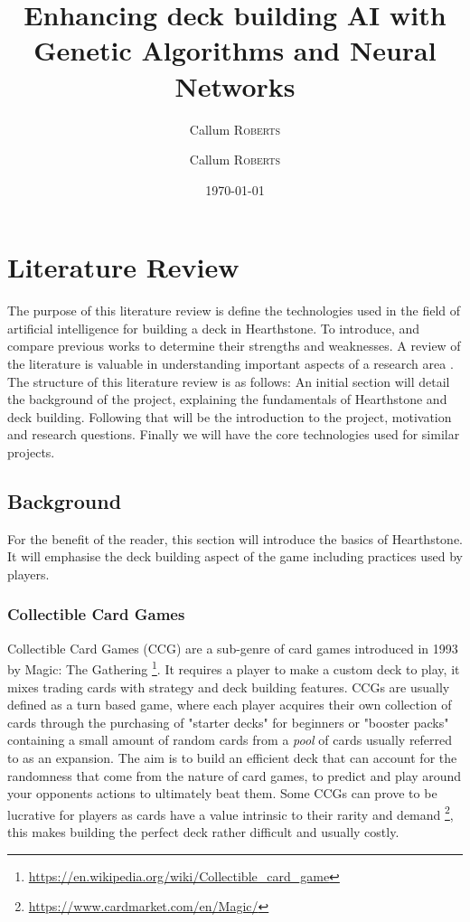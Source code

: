 \documentclass{report}
\title{Enhancing deck building AI with Genetic Algorithms and Neural Networks} %
\author{Callum \textsc{Roberts}} %
\author{Callum \textsc{Roberts}} %
\date{\today} %
\begin{document}
\maketitle %



\chapter{Literature Review}
The purpose of this literature review is define the technologies used in the field of artificial intelligence for building a deck in Hearthstone. To introduce, and compare previous works to determine their strengths and weaknesses. A review of the literature is valuable in understanding important aspects of a research area \cite{}. The structure of this literature review is as follows: An initial section will detail the background of the project, explaining the fundamentals of Hearthstone and deck building. Following that will be the introduction to the project,  motivation and research questions. Finally we will have the core technologies used for similar projects.
\section{Background}
	For the benefit of the reader, this section will introduce the basics of Hearthstone. It will emphasise the deck building aspect of the game including practices used by players.  
\subsection{Collectible Card Games}
	Collectible Card Games (CCG) are a sub-genre of card games introduced in 1993 by Magic: The Gathering \footnote{\url{https://en.wikipedia.org/wiki/Collectible_card_game}}. It requires a player to make a custom deck to play, it mixes trading cards with strategy and deck building features. CCGs are usually defined as a turn based game, where each player acquires their own collection of cards through the purchasing of "starter decks" for beginners or "booster packs" containing a small amount of random cards from a {\it{pool}} of cards usually referred to as an expansion. The aim is to build an efficient deck that can account for the randomness that come from the nature of card games, to predict and play around your opponents actions to ultimately beat them. Some CCGs can prove to be lucrative for players as cards have a value intrinsic to their rarity and demand \footnote{\url{https://www.cardmarket.com/en/Magic/}}, this makes building the perfect deck rather difficult and usually costly.
\end{document}
